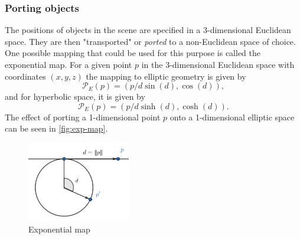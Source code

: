 \subsubsection*{Porting objects}
The positions of objects in the scene are specified in a 3-dimensional Euclidean space.
They are then "transported" or \textit{ported} to a non-Euclidean space of choice.
One possible mapping that could be used for this purpose is called the exponential map.
For a given point $p$ in the 3-dimensional Euclidean space with coordinates $(x, y, z)$ the mapping to elliptic geometry is given by
\begin{equation} \label{eq:elliptic-porting}
    \mathcal{P}_E(p) = (p / d \sin(d), \cos(d)),
\end{equation}
and for hyperbolic space, it is given by
\begin{equation*}
    \mathcal{P}_E(p) = (p / d \sinh(d), \cosh(d)).
\end{equation*}
The effect of porting a 1-dimensional point $p$ onto a 1-dimensional elliptic space can be seen in \autoref{fig:exp-map}.
\begin{figure}[h]
    \centering
    \includegraphics[width=0.4\textwidth]{chapters/theoretical_foundations/sections/non-eudlidean-spaces/resources/exp-map.png}
    \caption{Exponential map}
    \label{fig:exp-map}
\end{figure}